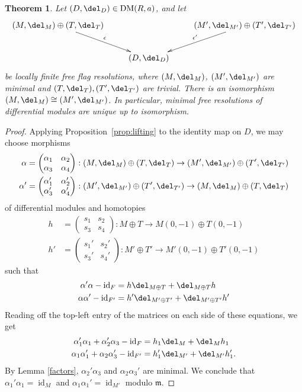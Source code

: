 \documentclass[12pt]{amsart}
\newtheorem{thm}[lemma]{Theorem}
\theoremstyle{definition}
\theoremstyle{remark}
\newcommand{\m}{\mathfrak m}
\newcommand{\id}{\operatorname{id}}
\def\a{\alpha}
\def\DM{\operatorname{DM}}
\begin{document}
\begin{thm}
\label{uniqueness}
Let $(D, \del_D) \in \DM(R, a)$, and let
$$
\xymatrix{
(M, \del_M) \oplus (T, \del_T) \ar[rd]^-{\epsilon}& &  (M', \del_{M'}) \oplus (T', \del_{T'}) \ar[ld]_-{\epsilon'}\\
&(D, \del_D)&
}
$$
be locally finite free flag resolutions, where $(M, \del_M)$, $(M', \del_{M'})$ are minimal and $(T, \del_T), (T', \del_{T'})$ are trivial. There is an isomorphism $(M, \del_M) \cong (M', \del_{M'})$. In particular, minimal free resolutions of differential modules are unique up to isomorphism.
\end{thm}

\begin{proof} 
Applying Proposition~\ref{prop:lifting} to the identity map on $D$, we may choose morphisms
\begin{align*}
\a = \begin{pmatrix} \a_1 & \a_2 \\ \a_3 & \a_4 \end{pmatrix}   :  (M, \del_M) \oplus (T, \del_T) \to (M', \del_{M'}) \oplus (T', \del_{T'}) \\
\a' = \begin{pmatrix} \a'_1 & \a'_2 \\ \a'_3 & \a'_4 \end{pmatrix} :  (M', \del_{M'}) \oplus (T', \del_{T'}) \to (M, \del_M) \oplus (T, \del_T) 
\end{align*}
of differential modules and homotopies
\begin{align*}
h & = \begin{pmatrix} s_1 & s_2 \\ s_3 & s_4 \end{pmatrix} : M \oplus T \to M(0, -1) \oplus T(0, -1) \\
h' & = \begin{pmatrix} s_1' & s_2' \\ s_3' & s_4' \end{pmatrix} : M' \oplus T' \to M'(0, -1) \oplus T'(0, -1)
\end{align*}
such that
\begin{align*}
\a'\a - \id_{F} &= h \del_{M \oplus T} + \del_{M \oplus T} h \\
\a\a' - \id_{F'} &= h' \del_{M' \oplus T'} + \del_{M' \oplus T'}h'
\end{align*}
Reading off the top-left entry of the matrices on each side of these equations, we get
\begin{align*}
\a_1'\a_1 + \a_2'\a_3  - \id_F&=  h_1 \del_M + \del_M h_1 \\
\a_1\a_1' + \a_2\a_3'  - \id_{F'} &=  h_1' \del_{M'} + \del_{M'} h_1'.
\end{align*}
By Lemma \ref{factors}, $\a_2'\a_3$ and $\a_2\a_3'$ are minimal. We conclude that $\a_1'\a_1 = \id_M$ and $\a_1\a_1' = \id_{M'}$ modulo $\m$. 


\end{proof}
\end{document}
